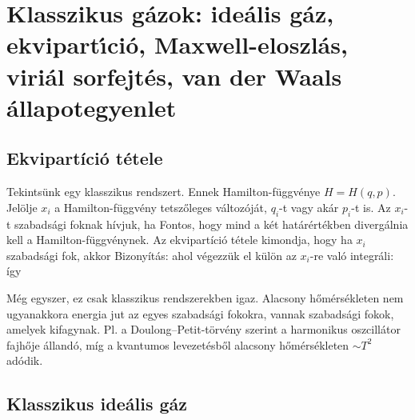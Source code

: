 \chapter{Klasszikus g\'azok: ide\'alis g\'az, ekvipart\'{\i}ci\'o, Maxwell-eloszl\'as, viri\'al sorfejt\'es, van der Waals \'allapotegyenlet} 
 
 \section{Ekvipartíció tétele}
  
  Tekintsünk egy klasszikus rendszert. Ennek Hamilton-függvénye $H=H(q,p)$. Jelölje $x_i$ a Hamilton-függvény tetszőleges változóját, $q_i$-t vagy akár $p_i$-t is. Az $x_i$-t szabadsági foknak hívjuk, ha 
  Fontos, hogy mind a két határértékben divergálnia kell a Hamilton-függvénynek. Az ekvipartíció tétele kimondja, hogy ha $x_i$ szabadsági fok, akkor 
  Bizonyítás:
  ahol végezzük el külön az $x_i$-re való integráli:
  így
  
  Még egyszer, ez csak klasszikus rendszerekben igaz. Alacsony hőmérsékleten nem ugyanakkora energia jut az egyes szabadsági fokokra, vannak szabadsági fokok, amelyek kifagynak. Pl. a Doulong--Petit-törvény szerint a harmonikus oszcillátor fajhője állandó, míg a kvantumos levezetésből alacsony hőmérsékleten $\sim T^2$ adódik. 
  
 \section{Klasszikus ideális gáz}\label{ss:B06-CID}
  
